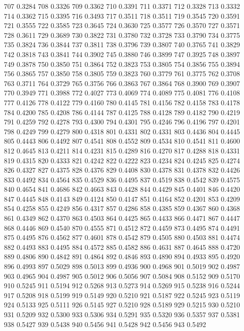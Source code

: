 707 0.3284
708 0.3326
709 0.3362
710 0.3391
711 0.3371
712 0.3328
713 0.3332
714 0.3362
715 0.3395
716 0.3493
717 0.3511
718 0.3511
719 0.3545
720 0.3591
721 0.3555
722 0.3585
723 0.3645
724 0.3630
725 0.3577
726 0.3570
727 0.3571
728 0.3611
729 0.3689
730 0.3822
731 0.3780
732 0.3728
733 0.3790
734 0.3775
735 0.3824
736 0.3844
737 0.3811
738 0.3796
739 0.3807
740 0.3765
741 0.3829
742 0.3818
743 0.3841
744 0.3902
745 0.3880
746 0.3899
747 0.3925
748 0.3897
749 0.3878
750 0.3850
751 0.3864
752 0.3823
753 0.3805
754 0.3856
755 0.3894
756 0.3865
757 0.3850
758 0.3805
759 0.3823
760 0.3779
761 0.3775
762 0.3708
763 0.3711
764 0.3729
765 0.3756
766 0.3863
767 0.3864
768 0.3900
769 0.3907
770 0.3949
771 0.3988
772 0.4027
773 0.4069
774 0.4089
775 0.4081
776 0.4108
777 0.4126
778 0.4122
779 0.4160
780 0.4145
781 0.4156
782 0.4158
783 0.4178
784 0.4200
785 0.4208
786 0.4144
787 0.4125
788 0.4128
789 0.4182
790 0.4219
791 0.4259
792 0.4278
793 0.4300
794 0.4301
795 0.4246
796 0.4196
797 0.4201
798 0.4249
799 0.4279
800 0.4318
801 0.4331
802 0.4331
803 0.4436
804 0.4445
805 0.4443
806 0.4492
807 0.4541
808 0.4552
809 0.4534
810 0.4541
811 0.4600
812 0.4645
813 0.4211
814 0.4231
815 0.4289
816 0.4270
817 0.4288
818 0.4331
819 0.4315
820 0.4333
821 0.4242
822 0.4222
823 0.4234
824 0.4245
825 0.4274
826 0.4327
827 0.4375
828 0.4376
829 0.4408
830 0.4378
831 0.4378
832 0.4426
833 0.4492
834 0.4564
835 0.4529
836 0.4495
837 0.4519
838 0.4542
839 0.4575
840 0.4654
841 0.4686
842 0.4663
843 0.4428
844 0.4429
845 0.4401
846 0.4420
847 0.4445
848 0.4143
849 0.4124
850 0.4147
851 0.4164
852 0.4201
853 0.4209
854 0.4258
855 0.4249
856 0.4317
857 0.4286
858 0.4385
859 0.4367
860 0.4368
861 0.4349
862 0.4370
863 0.4503
864 0.4425
865 0.4433
866 0.4471
867 0.4447
868 0.4446
869 0.4540
870 0.4555
871 0.4512
872 0.4459
873 0.4495
874 0.4491
875 0.4495
876 0.4562
877 0.4601
878 0.4542
879 0.4505
880 0.4503
881 0.4474
882 0.4493
883 0.4495
884 0.4572
885 0.4582
886 0.4631
887 0.4645
888 0.4720
889 0.4806
890 0.4842
891 0.4864
892 0.4846
893 0.4890
894 0.4933
895 0.4920
896 0.4993
897 0.5029
898 0.5013
899 0.4936
900 0.4968
901 0.5019
902 0.4987
903 0.4965
904 0.4987
905 0.5012
906 0.5056
907 0.5084
908 0.5152
909 0.5170
910 0.5245
911 0.5194
912 0.5268
913 0.5273
914 0.5269
915 0.5238
916 0.5244
917 0.5208
918 0.5199
919 0.5149
920 0.5210
921 0.5187
922 0.5245
923 0.5119
924 0.5133
925 0.5111
926 0.5145
927 0.5210
928 0.5189
929 0.5215
930 0.5210
931 0.5209
932 0.5300
933 0.5306
934 0.5291
935 0.5320
936 0.5357
937 0.5381
938 0.5427
939 0.5438
940 0.5456
941 0.5428
942 0.5456
943 0.5492
